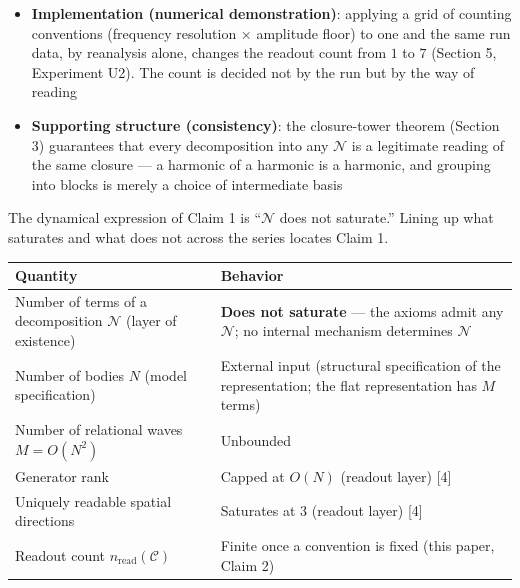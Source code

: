 \documentclass[
  a4paper,
]{article}
\newcounter{none} %
\providecommand{\tightlist}{%
  \setlength{\itemsep}{0pt}\setlength{\parskip}{0pt}}
\begin{document}
\begin{itemize}
\tightlist
\item
  \textbf{Implementation (numerical demonstration)}: applying a grid of
  counting conventions (frequency resolution × amplitude floor) to one
  and the same run data, by reanalysis alone, changes the readout count
  from \(1\) to \(7\) (Section 5, Experiment U2). The count is decided
  not by the run but by the way of reading
\item
  \textbf{Supporting structure (consistency)}: the closure-tower theorem
  (Section 3) guarantees that every decomposition into any
  \(\mathcal N\) is a legitimate reading of the same closure --- a
  harmonic of a harmonic is a harmonic, and grouping into blocks is
  merely a choice of intermediate basis
\end{itemize}

The dynamical expression of Claim 1 is ``\(\mathcal N\) does not
saturate.'' Lining up what saturates and what does not across the series
locates Claim 1.

{\def\LTcaptype{none} %
\begin{longtable}[]{@{}
  >{\raggedright\arraybackslash}p{}
  >{\raggedright\arraybackslash}p{}@{}}
\toprule\noalign{}
\begin{minipage}[b]{\linewidth}\raggedright
Quantity
\end{minipage} & \begin{minipage}[b]{\linewidth}\raggedright
Behavior
\end{minipage} \\
\midrule\noalign{}
\endhead
\bottomrule\noalign{}
\endlastfoot
Number of terms of a decomposition \(\mathcal N\) (layer of existence) &
\textbf{Does not saturate} --- the axioms admit any \(\mathcal N\); no
internal mechanism determines \(\mathcal N\) \\
Number of bodies \(N\) (model specification) & External input
(structural specification of the representation; the flat representation
has \(M\) terms) \\
Number of relational waves \(M=O(N^2)\) & Unbounded \\
Generator rank & Capped at \(O(N)\) (readout layer) {[}4{]} \\
Uniquely readable spatial directions & Saturates at 3 (readout layer)
{[}4{]} \\
Readout count \(n_{\mathrm{read}}(\mathcal C)\) & Finite once a
convention is fixed (this paper, Claim 2) \\
\end{longtable}
}
\end{document}
